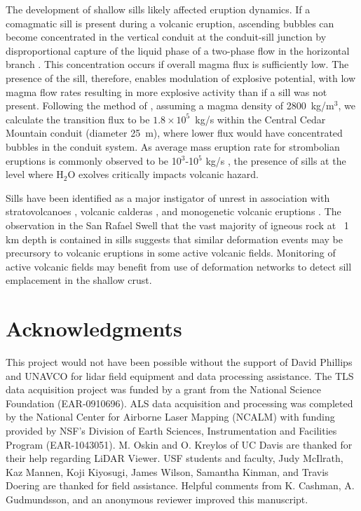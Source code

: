 The development of shallow sills likely affected eruption dynamics. If a comagmatic sill is present during a volcanic eruption, ascending bubbles can become concentrated in the vertical conduit at the conduit-sill junction by disproportional capture of the liquid phase of a two-phase flow in the horizontal branch \citep{conte2000experimental}. This concentration occurs if overall magma flux is sufficiently low. The presence of the sill, therefore, enables modulation of explosive potential, with low magma flow rates resulting in more explosive activity than if a sill was not present. Following the method of \citet{pioli2009controls}, assuming a magma density of 2800~kg/m$^3$, we calculate the transition flux to be $1.8\times 10^5$~kg/s within the Central Cedar Mountain conduit (diameter 25~m), where lower flux would have concentrated bubbles in the conduit system. As average mass eruption rate for strombolian eruptions is commonly observed to be 10$^3$-10$^5$ kg/s \citep{pioli2009controls}, the presence of sills at the level where H$_2$O exolves critically impacts volcanic hazard.

Sills have been identified as a major instigator of unrest in association with stratovolcanoes \citep[e.g.]{biggs2010stratovolcano,tarasewicz2012magma}, volcanic calderas \citep{macedonio2014sill}, and monogenetic volcanic eruptions \citep{erlund2010compositional}. The observation in the San Rafael Swell that the vast majority of igneous rock at ~1 km depth is contained in sills suggests that similar deformation events may be precursory to volcanic eruptions in some active volcanic fields. Monitoring of active volcanic fields may benefit from use of deformation networks to detect sill emplacement in the shallow crust.



\section{Acknowledgments}
This project would not have been possible without the support of David Phillips and UNAVCO for lidar field equipment and data processing assistance. The TLS data acquisition project was funded by a grant from the National Science Foundation (EAR-0910696). ALS data acquisition and processing was completed by the National Center for Airborne Laser Mapping (NCALM) with funding provided by NSF’s Division of Earth Sciences, Instrumentation and Facilities Program (EAR-1043051). M. Oskin and O. Kreylos of UC Davis are thanked for their help regarding LiDAR Viewer. USF students and faculty, Judy McIlrath, Kaz Mannen, Koji Kiyosugi, James Wilson, Samantha Kinman, and Travis Doering are thanked for field assistance. Helpful comments from K. Cashman, A. Gudmundsson, and an anonymous reviewer improved this manuscript.


% 
